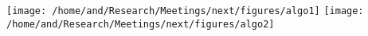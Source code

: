 \documentclass{article}
\begin{document}
\centering
\texttt{[image: /home/and/Research/Meetings/next/figures/algo1]}
\texttt{[image: /home/and/Research/Meetings/next/figures/algo2]}
\end{document}
